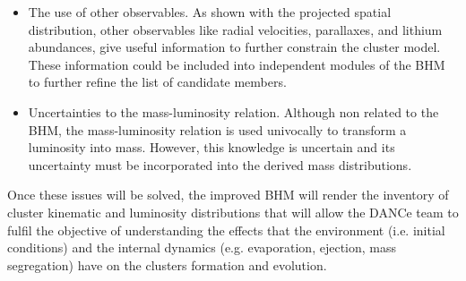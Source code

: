 \begin{itemize}
\item The use of other observables. As shown with the projected spatial distribution, other observables like radial velocities, parallaxes, and lithium abundances, give useful information to further constrain the cluster model. These information could be included into independent modules of the BHM to further refine the list of candidate members.
\item Uncertainties to the mass-luminosity relation. Although non related to the BHM, the mass-luminosity relation is used univocally to transform a luminosity into mass. However, this knowledge is uncertain and its uncertainty must be incorporated into the derived mass distributions.
\end{itemize}

Once these issues will be solved, the improved BHM will render the inventory of cluster kinematic and luminosity distributions that will allow the DANCe team to fulfil the objective of understanding the effects that the environment (i.e. initial conditions) and the internal dynamics (e.g. evaporation, ejection, mass segregation) have on the clusters formation and evolution.



